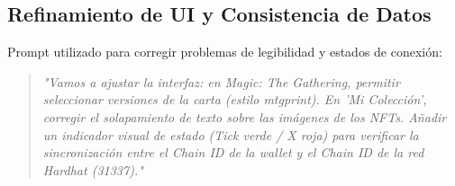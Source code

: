 \subsection{Refinamiento de UI y Consistencia de Datos}
Prompt utilizado para corregir problemas de legibilidad y estados de conexión:

\begin{quote}
	\textit{"Vamos a ajustar la interfaz: en Magic: The Gathering, permitir seleccionar versiones de la carta (estilo mtgprint). En 'Mi Colección', corregir el solapamiento de texto sobre las imágenes de los NFTs. Añadir un indicador visual de estado (Tick verde / X roja) para verificar la sincronización entre el Chain ID de la wallet y el Chain ID de la red Hardhat (31337)."}
\end{quote}